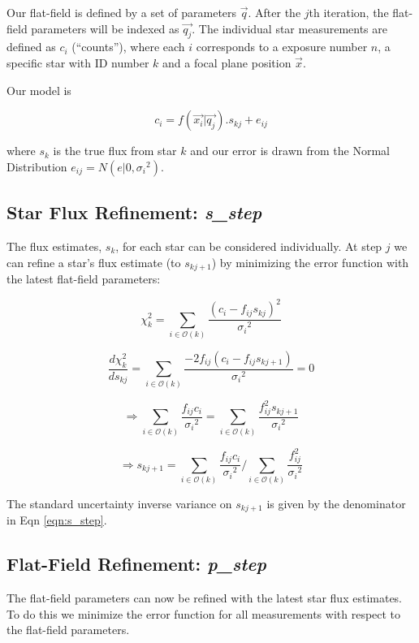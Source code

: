 \documentclass[12pt,a4paper,twoside]{article}
\begin{document}
Our flat-field is defined by a set of parameters $\vec{q}$. After the $j$th iteration, the flat-field parameters will be indexed as $\vec{q_j}$. The individual star measurements are defined as $c_i$ (``counts''), where each $i$ corresponds to a exposure number $n$, a specific star with ID number $k$ and a focal plane position $\vec{x}$.

Our model is

\begin{equation}
c_i = f(\vec{x_i} | \vec{q_j}) . s_{kj} + e_{ij}
\end{equation}

where $s_k$ is the true flux from star $k$ and our error is drawn from the Normal Distribution $e_{ij} = N(e|0,{\sigma_i}^2)$.

\subsection{Star Flux Refinement: \textbf{\textit{s\_step}}}
The flux estimates, $s_k$, for each star can be considered individually. At step $j$ we can refine a star's flux estimate (to $s_{kj+1}$) by minimizing the error function with the latest flat-field parameters:

\begin{equation}
\chi^2_{k} = \sum_{i \in \mathcal{O}(k)} \frac{(c_i-f_{ij}s_{kj})^2}{{\sigma_i}^2}
\end{equation}

\begin{equation}
\frac{d\chi^2_{k}}{d s_{kj}} = \sum_{i \in \mathcal{O}(k)} \frac{-2 f_{ij} (c_i-f_{ij}s_{kj+1})}{{\sigma_i}^2} = 0
\end{equation}

\begin{equation}
\Rightarrow \sum_{i \in \mathcal{O}(k)} \frac{f_{ij} c_i}{{\sigma_i}^2}= \sum_{i \in \mathcal{O}(k)} \frac{f_{ij}^2 s_{kj+1}}{{\sigma_i}^2}
\end{equation}

\begin{equation}
\Rightarrow s_{kj+1} = {\sum_{i \in \mathcal{O}(k)} \frac{f_{ij} c_i}{{\sigma_i}^2}}/{\sum_{i \in \mathcal{O}(k)} \frac{f_{ij}^2}{{\sigma_i}^2}} \label{eqn:s_step}
\end{equation}

The standard uncertainty inverse variance on $s_{kj+1}$ is given by the denominator in Eqn \ref{eqn:s_step}.

\subsection{Flat-Field Refinement: \textbf{\textit{p\_step}}}
The flat-field parameters can now be refined with the latest star flux estimates. To do this we minimize the error function for all measurements with respect to the flat-field parameters.
\end{document}
